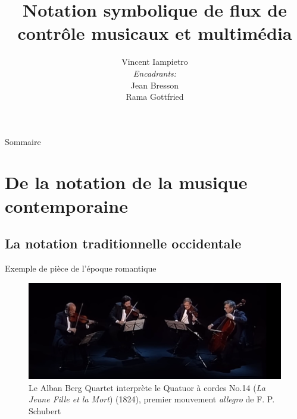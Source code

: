 \documentclass[pdf]{beamer}
\title[]{Notation symbolique de flux de contrôle musicaux et multimédia}
\institute[]{Faculté des sciences - Université de Montpellier}
\author[]{Vincent Iampietro\\[2ex] {\small \textit{Encadrants:} \\ Jean Bresson \\ Rama Gottfried}}
\begin{document}
\begin{frame}[plain]
	\titlepage
\end{frame}

\begin{frame}[plain]{Sommaire}
	\tableofcontents
\end{frame}

\section[De la notation]{De la notation de la musique contemporaine}

\subsection[Notation traditionnelle]{La notation traditionnelle occidentale}
\begin{frame}{Exemple de pièce de l'époque romantique}

\begin{figure}
	\centering
	\includegraphics[keepaspectratio=true, width=\textwidth]{./medias/quatuorACordes.png}
	\caption{Le Alban Berg Quartet interprète le Quatuor à cordes No.14 (\textit{La Jeune Fille et la Mort}) (1824), premier mouvement \textit{allegro} de F. P. Schubert }
\end{figure}

\end{frame}
\end{document}
